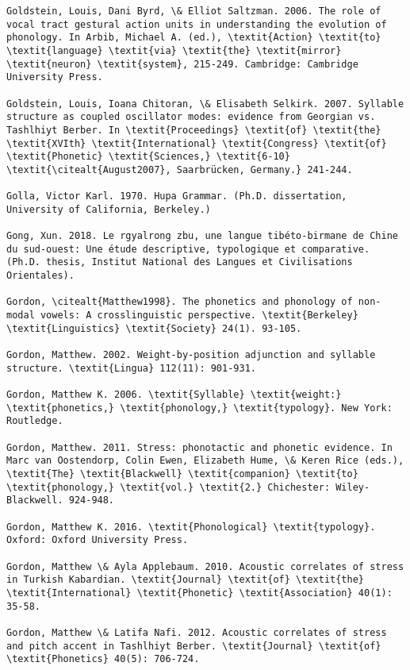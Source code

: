 \begin{verbatim}
Goldstein, Louis, Dani Byrd, \& Elliot Saltzman. 2006. The role of vocal tract gestural action units in understanding the evolution of phonology. In Arbib, Michael A. (ed.), \textit{Action} \textit{to} \textit{language} \textit{via} \textit{the} \textit{mirror} \textit{neuron} \textit{system}, 215-249. Cambridge: Cambridge University Press.

Goldstein, Louis, Ioana Chitoran, \& Elisabeth Selkirk. 2007. Syllable structure as coupled oscillator modes: evidence from Georgian vs. Tashlhiyt Berber. In \textit{Proceedings} \textit{of} \textit{the} \textit{XVIth} \textit{International} \textit{Congress} \textit{of} \textit{Phonetic} \textit{Sciences,} \textit{6-10} \textit{\citealt{August2007}, Saarbrücken, Germany.} 241-244.

Golla, Victor Karl. 1970. Hupa Grammar. (Ph.D. dissertation, University of California, Berkeley.)

Gong, Xun. 2018. Le rgyalrong zbu, une langue tibéto-birmane de Chine du sud-ouest: Une étude descriptive, typologique et comparative. (Ph.D. thesis, Institut National des Langues et Civilisations Orientales).

Gordon, \citealt{Matthew1998}. The phonetics and phonology of non-modal vowels: A crosslinguistic perspective. \textit{Berkeley} \textit{Linguistics} \textit{Society} 24(1). 93-105.

Gordon, Matthew. 2002. Weight-by-position adjunction and syllable structure. \textit{Lingua} 112(11): 901-931.

Gordon, Matthew K. 2006. \textit{Syllable} \textit{weight:} \textit{phonetics,} \textit{phonology,} \textit{typology}. New York: Routledge.

Gordon, Matthew. 2011. Stress: phonotactic and phonetic evidence. In Marc van Oostendorp, Colin Ewen, Elizabeth Hume, \& Keren Rice (eds.), \textit{The} \textit{Blackwell} \textit{companion} \textit{to} \textit{phonology,} \textit{vol.} \textit{2.} Chichester: Wiley-Blackwell. 924-948.

Gordon, Matthew K. 2016. \textit{Phonological} \textit{typology}. Oxford: Oxford University Press.

Gordon, Matthew \& Ayla Applebaum. 2010. Acoustic correlates of stress in Turkish Kabardian. \textit{Journal} \textit{of} \textit{the} \textit{International} \textit{Phonetic} \textit{Association} 40(1): 35-58.

Gordon, Matthew \& Latifa Nafi. 2012. Acoustic correlates of stress and pitch accent in Tashlhiyt Berber. \textit{Journal} \textit{of} \textit{Phonetics} 40(5): 706-724.


\end{verbatim}
